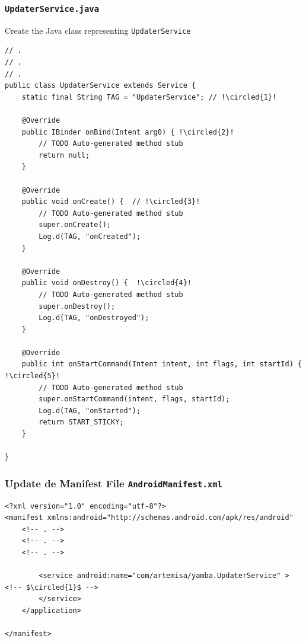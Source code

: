 \begin{frame}
\frametitle{\texttt{UpdaterService.java}}
Create the Java class representing \texttt{UpdaterService}

\lstset{language=java, style=eclipse, breaklines=true, tabsize=2}
\begin{lstlisting}[caption=src/com/artemisa/yamba/UpdaterService.java, basicstyle=\tiny,escapechar=!]
// .
// .
// .
public class UpdaterService extends Service {
	static final String TAG = "UpdaterService"; // !\circled{1}!

	@Override
	public IBinder onBind(Intent arg0) { !\circled{2}!
		// TODO Auto-generated method stub
		return null;
	}

	@Override
	public void onCreate() {  // !\circled{3}!
		// TODO Auto-generated method stub
		super.onCreate();
		Log.d(TAG, "onCreated");
	}

	@Override
	public void onDestroy() {  !\circled{4}!
		// TODO Auto-generated method stub
		super.onDestroy();
		Log.d(TAG, "onDestroyed");
	}

	@Override
	public int onStartCommand(Intent intent, int flags, int startId) { !\circled{5}!
		// TODO Auto-generated method stub
		super.onStartCommand(intent, flags, startId);
		Log.d(TAG, "onStarted");
		return START_STICKY;
	}

}
\end{lstlisting}
\end{frame}
\begin{frame}
\frametitle{Update de Manifest File \texttt{AndroidManifest.xml}}
\lstset{language=XML, style=eclipse,breaklines=true, tabsize=2}
\begin{lstlisting}[caption=AndroidManifest.xml, basicstyle=\tiny,escapechar=$]
<?xml version="1.0" encoding="utf-8"?>
<manifest xmlns:android="http://schemas.android.com/apk/res/android"
    <!-- . -->
    <!-- . -->
    <!-- . -->

        <service android:name="com/artemisa/yamba.UpdaterService" > <!-- $\circled{1}$ -->
        </service>
    </application>

</manifest>
\end{lstlisting}
\end{frame}
